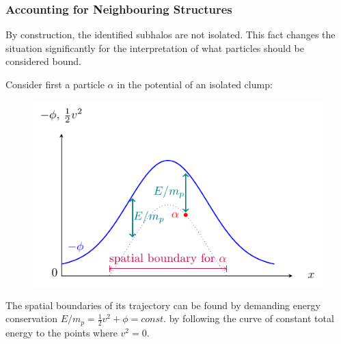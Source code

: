 \begin{frame}
	\frametitle{Accounting for Neighbouring Structures}
	
	By construction, the identified subhalos are not isolated. 
	This fact changes the situation significantly for the interpretation of what particles should be considered bound.
	
	Consider first a particle $\alpha$ in the potential of an isolated clump:
	
	
	\begin{figure}
		\centering
		\includegraphics[width=.7\textwidth]{../report/images/tikz/boundaries.pdf}
	\end{figure}
	
	
	The spatial boundaries of its trajectory can be found by demanding energy conservation
	$	E/m_p = \frac{1}{2} v^2 + \phi = const.	$
	by following the curve of constant total energy to the points where $v^2 =0$. 
\end{frame}








